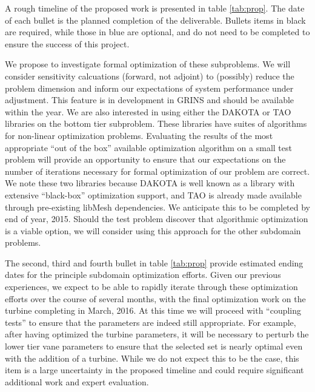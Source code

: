 

%
%
A rough timeline of the proposed work is presented in table
\ref{tab:prop}. The date of each bullet is the planned completion of the
deliverable. Bullets items in black are required, while those in blue
are optional, and do not need to be completed to ensure the
success of this project. 

% 
% 
We propose to investigate formal optimization of these subproblems. 
We will consider sensitivity calcuations (forward, not adjoint)
to (possibly) reduce the problem dimension and inform our expectations
of system performance under adjustment. This feature is in development
in GRINS and should be available within the year. We are also interested
in using either the DAKOTA\cite{adams2013dakota} or
TAO\cite{tao-user-ref} libraries on the bottom tier subproblem. These
libraries have suites of algorithms for non-linear optimization
problems. Evaluating the results of the most appropriate ``out of the
box'' available optimization algorithm on a small test problem will
provide an opportunity to ensure that our expectations on the number of
iterations necessary for formal optimization of our problem are correct. 
We note these two libraries because DAKOTA is well known as a library
with extensive ``black-box'' optimization support, and TAO is already
made available through pre-existing libMesh dependencies. We anticipate
this to be completed by end of year, 2015. Should the test problem
discover that algorithmic optimization is a viable option, we will
consider using this approach for the other subdomain problems. 
%
%

The second, third and fourth bullet in table \ref{tab:prop} provide
estimated ending dates for the principle subdomain optimization
efforts. Given our previous experiences, we expect to be able to rapidly
iterate through these optimization efforts over the course of several
months, with the final optimization work on the turbine completing in
March, 2016. At this time we will proceed with ``coupling tests'' to
ensure that the parameters are indeed still appropriate. For example,
after having optimized the turbine parameters, it will be necessary to
perturb the lower tier vane parameters to ensure that the selected set
is nearly optimal even with the addition of a turbine. While we do not
expect this to be the case, this item is a large uncertainty in the
proposed timeline and could
require significant additional work and expert evaluation. 

